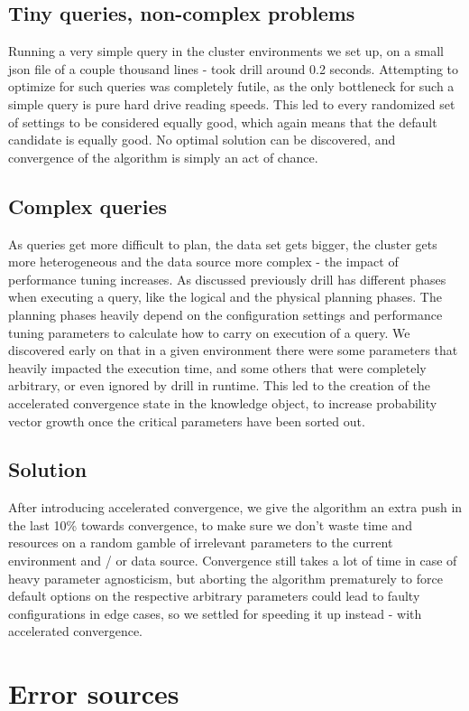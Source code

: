 \documentclass[a4paper,english]{report}
\begin{document}
		\subsection{Tiny queries, non-complex problems}
		Running a very simple query in the cluster environments we set up, on a small json file of a couple thousand lines - took drill around 0.2 seconds. Attempting to optimize for such queries was completely futile, as the only bottleneck for such a simple query is pure hard drive reading speeds. This led to every randomized set of settings to be considered equally good, which again means that the default candidate is equally good. No optimal solution can be discovered, and convergence of the algorithm is simply an act of chance.
		\subsection{Complex queries}
		As queries get more difficult to plan, the data set gets bigger, the cluster gets more heterogeneous and the data source more complex - the impact of performance tuning increases. As discussed previously drill has different phases when executing a query, like the logical and the physical planning phases. The planning phases heavily depend on the configuration settings and performance tuning parameters to calculate how to carry on execution of a query. We discovered early on that in a given environment there were some parameters that heavily impacted the execution time, and some others that were completely arbitrary, or even ignored by drill in runtime. This led to the creation of the accelerated convergence state in the knowledge object, to increase probability vector growth once the critical parameters have been sorted out.
		\subsection{Solution}
		After introducing accelerated convergence, we give the algorithm an extra push in the last 10\% towards convergence, to make sure we don't waste time and resources on a random gamble of irrelevant parameters to the current environment and / or data source. Convergence still takes a lot of time in case of heavy parameter agnosticism, but aborting the algorithm prematurely to force default options on the respective arbitrary parameters could lead to faulty configurations in edge cases, so we settled for speeding it up instead - with accelerated convergence.
		\clearpage
	\section{Error sources}
\end{document}
